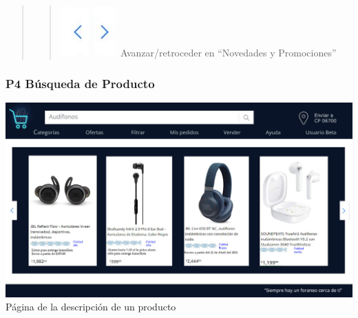 \documentclass[14pt]{article}
\begin{document}
\begin{quote}
\begin{quote}
                            \includegraphics[height=0.02\textwidth]{BotonAnterior.jpg} \includegraphics[height=0.02\textwidth]{BotonSiguiente.jpg}
                            \label{P3:BotonesAnterior/Siguiente} Avanzar/retroceder en “Novedades y Promociones”
                    \end{quote}
                \end{quote}
            
            \newpage
            \subsubsection{P4 Búsqueda de Producto}\label{P4 Búsqueda de Producto}
                \begin{center}
                    \includegraphics[height=0.55\textwidth]{Busqueda.jpg} \\ [Figura 5] Página de la descripción de un producto
                \end{center}
\end{document}
